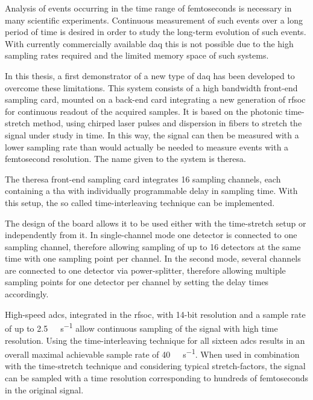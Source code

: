 
Analysis of events occurring in the time range of femtoseconds is necessary in many scientific experiments.
Continuous measurement of such events over a long period of time is desired in order to study the long-term evolution of such events.
With currently commercially available \gls{daq} this is not possible due to the high sampling rates required and the limited memory space of such systems. 

In this thesis, a first demonstrator of a new type of \gls{daq} has been developed to overcome these limitations.
This system consists of a high bandwidth front-end sampling card, mounted on a back-end card integrating a new generation of \gls{rfsoc} for continuous readout of the acquired samples. 
It is based on the photonic time-stretch method, using chirped laser pulses and dispersion in fibers to stretch the signal under study in time.
In this way, the signal can then be measured with a lower sampling rate than would actually be needed to measure events with a femtosecond resolution.
The name given to the system is \gls{theresa}.

The \gls{theresa} front-end sampling card integrates 16 sampling channels, each containing a \gls{tha} with individually programmable delay in sampling time. 
With this setup, the so called time-interleaving technique can be implemented. 

The design of the board allows it to be used either with the time-stretch setup or independently from it.
In single-channel mode one detector is connected to one sampling channel, therefore allowing sampling of up to 16 detectors at the same time with one sampling point per channel.
In the second mode, several channels are connected to one detector via power-splitter, therefore allowing multiple sampling points for one detector per channel by setting the delay times accordingly. 

High-speed \glspl{adc}, integrated in the \gls{rfsoc}, with 14-bit resolution and a sample rate of up to \SI{2.5}{\giga \sample\per\second} allow continuous sampling of the signal with high time resolution. 
Using the time-interleaving technique for all sixteen \glspl{adc} results in an overall maximal achievable sample rate of \SI{40}{\giga\sample\per\second}. 
When used in combination with the time-stretch technique and considering typical stretch-factors, the signal can be sampled with a time resolution corresponding to hundreds of femtoseconds in the original signal.

